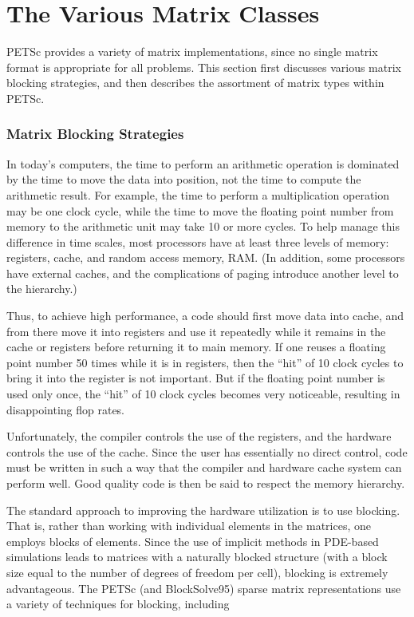 \documentclass[twoside,12pt]{../sty/report_petsc}
\newcommand{\sindex}[1]{\index{#1}}
\begin{document}
\chapter{The Various Matrix Classes}
\label{sec:matclasses}

PETSc provides a variety of matrix implementations, since no single
matrix format is appropriate for all problems.  This section first
discusses various matrix blocking strategies, and then 
describes the assortment of matrix types within PETSc.

\subsection{Matrix Blocking Strategies}
\sindex{matrix blocking} 
\sindex{blocking} 

In today's computers, the time to perform an arithmetic operation is
dominated by the time to move the data into position, not the time to
compute the arithmetic result.  For example, the time to perform a
multiplication operation may be one clock cycle, while the time to
move the floating point number from memory to the arithmetic unit may
take 10 or more cycles. To help manage this difference in time scales,
most processors have at least three levels of memory: registers,
cache, and random access memory, RAM. (In addition, some processors
have external caches, and the complications of paging introduce
another level to the hierarchy.)

Thus, to achieve high performance, a code should first move data into
cache, and from there move it into registers and use it repeatedly
while it remains in the cache or registers before returning it to main
memory. If one reuses a floating point number 50 times while it is in
registers, then the ``hit'' of 10 clock cycles to bring it into the
register is not important. But if the floating point number is used
only once, the ``hit'' of 10 clock cycles becomes very noticeable,
resulting in disappointing flop rates.

Unfortunately, the compiler controls the use of the registers, and the
hardware controls the use of the cache. Since the user has essentially
no direct control, code must be written in such a way that the
compiler and hardware cache system can perform well. Good quality code
is then be said to respect the memory hierarchy.

The standard approach to improving the hardware utilization is to use
blocking. That is, rather than working with individual elements in
the matrices, one employs blocks of elements.  Since the use of
implicit methods in PDE-based simulations leads to matrices with a
naturally blocked structure (with a block size equal to the number of
degrees of freedom per cell), blocking is extremely advantageous.  The
PETSc (and BlockSolve95) sparse matrix representations use a variety
of techniques for blocking, including
\end{document}
